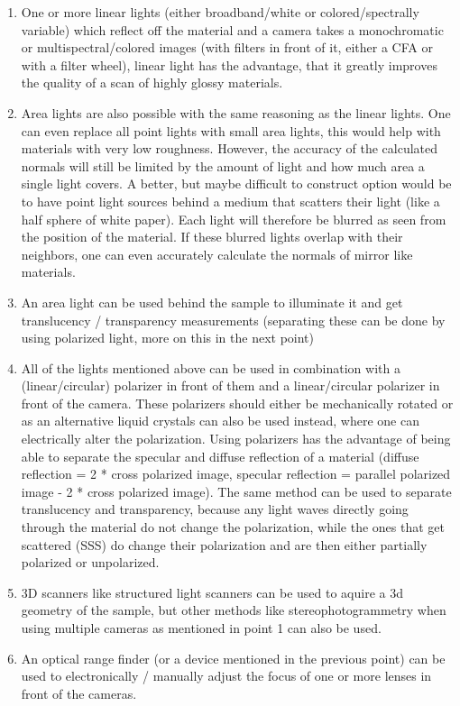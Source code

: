 \documentclass[11pt, twoside, listof=totocnumbered, bibliography=totocnumbered]{scrartcl}
\begin{document}
\begin{enumerate}
	\item One or more linear lights (either broadband/white or colored/spectrally variable) which reflect off the material and a camera takes a monochromatic or multispectral/colored images (with filters in front of it, either a CFA or with a filter wheel), linear light has the advantage, that it greatly improves the quality of a scan of highly glossy materials.
	\item Area lights are also possible with the same reasoning as the linear lights. One can even replace all point lights with small area lights, this would help with materials with very low roughness. However, the accuracy of the calculated normals will still be limited by the amount of light and how much area a single light covers. A better, but maybe difficult to construct option would be to have point light sources behind a medium that scatters their light (like a half sphere of white paper). Each light will therefore be blurred as seen from the position of the material. If these blurred lights overlap with their neighbors, one can even accurately calculate the normals of mirror like materials. \cite{PS_AreaLights}
	\item An area light can be used behind the sample to illuminate it and get translucency / transparency measurements (separating these can be done by using polarized light, more on this in the next point)
	\item All of the lights mentioned above can be used in combination with a (linear/circular) polarizer in front of them and a linear/circular polarizer in front of the camera. These polarizers should either be mechanically rotated or as an alternative liquid crystals can also be used instead, where one can electrically alter the polarization. Using polarizers has the advantage of being able to separate the specular and diffuse reflection of a material (diffuse reflection = 2 * cross polarized image, specular reflection = parallel polarized image - 2 * cross polarized image). The same method can be used to separate translucency and transparency, because any light waves directly going through the material do not change the polarization, while the ones that get scattered (SSS) do change their polarization and are then either partially polarized or unpolarized.	
	\item 3D scanners like structured light scanners can be used to aquire a 3d geometry of the sample, but other methods like stereophotogrammetry when using multiple cameras as mentioned in point 1 can also be used.
	\item An optical range finder (or a device mentioned in the previous point) can be used to electronically / manually adjust the focus of one or more lenses in front of the cameras.

\end{enumerate}
\end{document}
